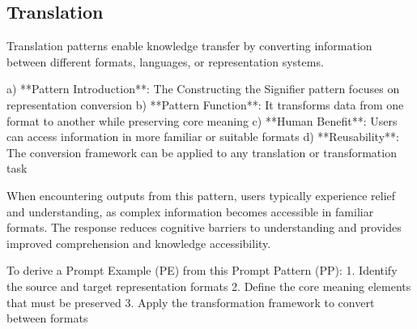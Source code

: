 

\subsection{Translation}
\label{subsec:Translation}
Translation patterns enable knowledge transfer by converting information between different formats, languages, or representation systems.


a) **Pattern Introduction**: The Constructing the Signifier pattern focuses on representation conversion
b) **Pattern Function**: It transforms data from one format to another while preserving core meaning  
c) **Human Benefit**: Users can access information in more familiar or suitable formats
d) **Reusability**: The conversion framework can be applied to any translation or transformation task



When encountering outputs from this pattern, users typically experience relief and understanding, as complex information becomes accessible in familiar formats. 
The response reduces cognitive barriers to understanding and provides improved comprehension and knowledge accessibility.



To derive a Prompt Example (PE) from this Prompt Pattern (PP):
1. Identify the source and target representation formats
2. Define the core meaning elements that must be preserved
3. Apply the transformation framework to convert between formats




